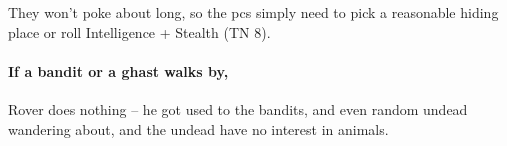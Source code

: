 They won't poke about long, so the \glspl{pc} simply need to pick a reasonable hiding place or roll Intelligence + Stealth (TN 8).

\paragraph{If a bandit or a ghast walks by,}
Rover does nothing -- he got used to the bandits, and even random undead wandering about, and the undead have no interest in animals.


\vfill\null


